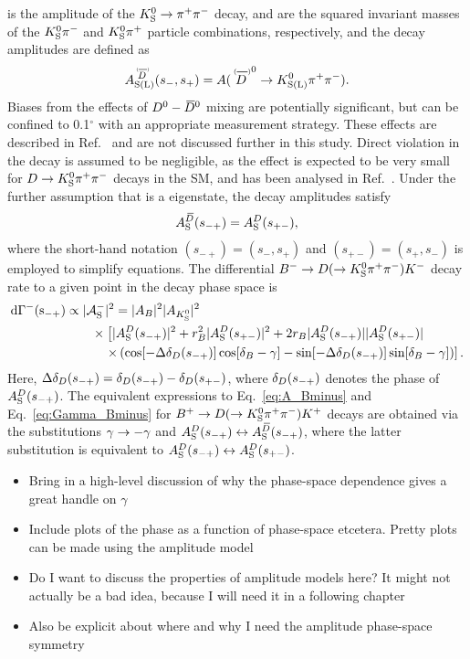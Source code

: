 \AKS is the amplitude of the ${{K}^0_{\mathrm{S}}}\rightarrow{\ensuremath{{\pi}^+}}{\ensuremath{{\pi}^-}}$ decay, \sm and \sp are the squared invariant masses of the ${{K}^0_{\mathrm{S}}}{{\pi}^-}$ and ${{K}^0_{\mathrm{S}}}{{\pi}^+}$ particle combinations, respectively, and the \D decay amplitudes are defined as
\begin{align}\label{eq:ADDb_definition}
\ADorDbSL (\smpLong)= A(\DorDbar^0\to K^0_\text{S(L)} \pi^+\pi^-).
\end{align}
Biases from the effects of ${{D}^0}-{{\kern 0.18em\overline{\kern -0.18em D}}{}^0}$ mixing are potentially significant, but can be confined to 0.1$^\circ$ with an appropriate measurement strategy. These effects are described in Ref.~\cite{Dmixing} and are not discussed further in this study. Direct \CP violation in the \D decay is assumed to be negligible, as the effect is expected to be very small for ${D}\rightarrow{\ensuremath{{K}^0_{\mathrm{S}}}}{\ensuremath{{\pi}^+}}{\ensuremath{{\pi}^-}}$ decays in the SM, and has been analysed in Ref.~\cite{PhysRevD.82.034033}.
Under the further assumption that \KS is a \CP eigenstate, the \D decay amplitudes satisfy 
\begin{align}\label{eq:KS_symmetry}
     A_{\rm S}^{{\kern 0.18em\overline{\kern -0.18em D}}}(s_{-+})=A_{\rm S}^{D}(s_{+-}), 
 \end{align} where the short-hand notation $(s_{-+})=(s_-,s_+)$ and $(s_{+-})=(s_+,s_-)$ is employed to simplify equations. The differential ${{{B}^-}}\rightarrow{\ensuremath{D}}(\rightarrow{\ensuremath{{K}^0_{\mathrm{S}}}} \pi^+ \pi^-){{K}^-}$ decay rate to a given point in the \D decay phase space is
\begin{align} \label{eq:Gamma_Bminus}
    \rm {d} \Gamma^-(s_{-+}) &\propto |\mathcal{A}_{\rm S}^-|^2 = |A_{B}|^2|A_{{{K}^0_{\mathrm{S}}}}|^2 \notag \\
    &\qquad\times\left[|A_{\rm S}^{D}(s_{-+})|^2 + r_{B}^2 |A_{\rm S}^{D}(s_{+-})|^2 + 2r_{B} |A_{\rm S}^{D}(s_{-+})||A_{\rm S}^{D}(s_{+-})|\right .
    \notag \\
    &\quad\qquad \left. \times \left(\cos[-\Delta\delta_D(s_{-+})]\cos[\delta_{B}-\gamma]-\sin[-\Delta\delta_D(s_{-+})]\sin[\delta_{B}-\gamma]\right)\right].
\end{align}
Here, $\Delta\delta_{D}(s_{-+}) = \delta_D(s_{-+}) - \delta_D(s_{+-})$, where $\delta_D(s_{-+})$ denotes the phase of $A_{\rm S}^{D}(s_{-+})$. The equivalent expressions to Eq.~\eqref{eq:A_Bminus} and Eq.~\eqref{eq:Gamma_Bminus} for ${{{B}^+}}\rightarrow{\ensuremath{D}}(\rightarrow{\ensuremath{{K}^0_{\mathrm{S}}}} \pi^+ \pi^-){{K}^+}$ decays are obtained via the substitutions $\gamma\rightarrow-\gamma$ and $A_{\rm S}^{D}(s_{-+})\leftrightarrow A_{\rm S}^{{\kern 0.18em\overline{\kern -0.18em D}}}(s_{-+})$, where the latter substitution is equivalent to $A_{\rm S}^{D}(s_{-+})\leftrightarrow A_{\rm S}^{D}(s_{+-})$.


\begin{itemize}
    \item Bring in a high-level discussion of why the phase-space dependence gives a great handle on $\gamma$
    \item Include plots of the phase as a function of phase-space etcetera. Pretty plots can be made using the amplitude model
    \item Do I want to discuss the properties of amplitude models here? It might not actually be a bad idea, because I will need it in a following chapter
    \item Also be explicit about where and why I need the amplitude phase-space symmetry
\end{itemize}

